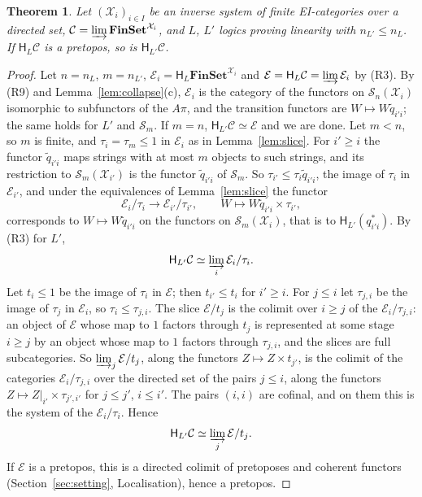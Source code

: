 \documentclass[11pt]{amsart}
\newtheorem{thm}{Theorem}[section]
\theoremstyle{definition}
\newcommand{\Fin}{\mathbf{FinSet}}
\newcommand{\HH}{\mathsf H}
\newcommand{\cX}{\mathcal X}
\newcommand{\cC}{\mathcal C}
\newcommand{\cE}{\mathcal E}
\newcommand{\cS}{\mathcal S}
\begin{document}
\begin{thm}\label{thm:mono}
Let $(\cX_i)_{i\in I}$ be an inverse system of finite EI-categories
over a directed set, $\cC=\varinjlim\Fin^{\cX_i}$, and $L$, $L'$
logics proving linearity with $n_{L'}\le n_L$. If $\HH_L\cC$ is a
pretopos, so is $\HH_{L'}\cC$.
\end{thm}
\begin{proof}
Let $n=n_L$, $m=n_{L'}$, $\cE_i=\HH_L\Fin^{\cX_i}$ and
$\cE=\HH_L\cC=\varinjlim\cE_i$ by (R3). By (R9) and
Lemma~\ref{lem:collapse}(c), $\cE_i$ is the category of the functors
on $\cS_n(\cX_i)$ isomorphic to subfunctors of the $A\pi$, and the
transition functors are $W\mapsto W\tilde q_{i'i}$; the same holds for
$L'$ and $\cS_m$. If $m=n$, $\HH_{L'}\cC\simeq\cE$ and we are done.
Let $m<n$, so $m$ is finite, and $\tau_i=\tau_m\le1$ in $\cE_i$ as in
Lemma~\ref{lem:slice}. For $i'\ge i$ the functor $\tilde q_{i'i}$ maps
strings with at most $m$ objects to such strings, and its restriction
to $\cS_m(\cX_{i'})$ is the functor $\tilde q_{i'i}$ of $\cS_m$. So
$\tau_{i'}\le\tau_i\tilde q_{i'i}$, the image of $\tau_i$ in
$\cE_{i'}$, and under the equivalences of Lemma~\ref{lem:slice} the
functor
\[
\cE_i/\tau_i\to\cE_{i'}/\tau_{i'},\qquad W\mapsto W\tilde
q_{i'i}\times\tau_{i'},
\]
corresponds to $W\mapsto W\tilde q_{i'i}$ on the functors on
$\cS_m(\cX_i)$, that is to $\HH_{L'}(q_{i'i}^*)$. By (R3) for $L'$,
\[
\HH_{L'}\cC\simeq\varinjlim_i\cE_i/\tau_i .
\]
Let $t_i\le1$ be the image of $\tau_i$ in $\cE$; then $t_{i'}\le t_i$
for $i'\ge i$. For $j\le i$ let $\tau_{j,i}$ be the image of $\tau_j$
in $\cE_i$, so $\tau_i\le\tau_{j,i}$. The slice $\cE/t_j$ is the
colimit over $i\ge j$ of the $\cE_i/\tau_{j,i}$: an object of $\cE$
whose map to $1$ factors through $t_j$ is represented at some stage
$i\ge j$ by an object whose map to $1$ factors through $\tau_{j,i}$,
and the slices are full subcategories. So $\varinjlim_j\cE/t_j$, along
the functors $Z\mapsto Z\times t_{j'}$, is the colimit of the
categories $\cE_i/\tau_{j,i}$ over the directed set of the pairs
$j\le i$, along the functors $Z\mapsto Z|_{i'}\times\tau_{j',i'}$ for
$j\le j'$, $i\le i'$. The pairs $(i,i)$ are cofinal, and on them this
is the system of the $\cE_i/\tau_i$. Hence
\[
\HH_{L'}\cC\simeq\varinjlim_j\cE/t_j .
\]
If $\cE$ is a pretopos, this is a directed colimit of pretoposes and
coherent functors (Section~\ref{sec:setting}, Localisation), hence a
pretopos.
\end{proof}
\end{document}
